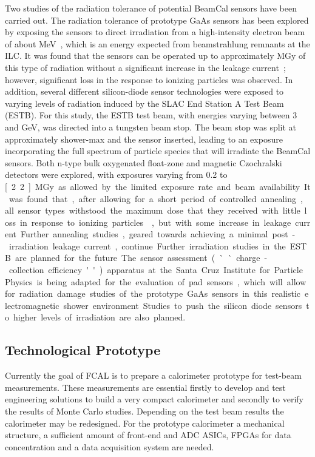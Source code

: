 Two studies of the radiation tolerance of potential BeamCal sensors have been carried out. The
radiation tolerance of prototype GaAs sensors has been explored by exposing the sensors
to direct irradiation from a high-intensity electron beam of about \unit[10]{MeV}~\cite{sdalinac},
which is an energy expected from beamstrahlung
remnants at the ILC.
It was found that the sensors can be operated up
to approximately \unit[1]{MGy} of this type of radiation without a significant increase in the
leakage current~\cite{1748-0221-7-11-P11022}; however, significant loss in the response to ionizing particles was observed.
In addition, several different silicon-diode sensor technologies were exposed to varying levels
of radiation induced by the SLAC End Station A Test Beam (ESTB).
For this study, the ESTB test beam, with energies
varying between 3 and \unit[11]{GeV}, was directed into a tungsten beam stop.
The beam stop was split at approximately shower-max and the sensor inserted,
leading to an exposure incorporating the full spectrum of particle species that will
irradiate the BeamCal sensors. Both n-type bulk oxygenated float-zone and magnetic Czochralski
detectors were explored, with exposures varying from 0.2 to \unit[2.2]{MGy} as allowed by
the limited exposure rate and
beam availability. It was found that, after allowing for a short period of controlled annealing,
all sensor types withstood the maximum dose that they received with little loss in response
to ionizing particles~\cite{2014arXiv1402.2692B}, but with some increase in leakage current. Further annealing studies,
geared towards achieving a minimal post-irradiation leakage current, continue.
Further irradiation studies in the ESTB are planned for the future.
The sensor assessment (``charge-collection efficiency'') apparatus at the Santa Cruz Institute
for Particle Physics is being adapted for the evaluation of pad sensors, which will allow for radiation
damage studies of the prototype GaAs sensors in this realistic electromagnetic shower environment.
Studies to push the silicon diode sensors to higher levels of irradiation are also planned.


\subsection{Technological Prototype}

Currently the goal of FCAL is to prepare a calorimeter prototype for test-beam measurements. These measurements
are essential firstly to develop and test engineering solutions to build a very compact calorimeter and
secondly to verify the results of Monte Carlo studies. Depending on the test beam
results the calorimeter may be redesigned.
For the prototype calorimeter
a mechanical structure, a sufficient amount of front-end and ADC ASICs, FPGAs for
data concentration and
a data acquisition system are needed.


